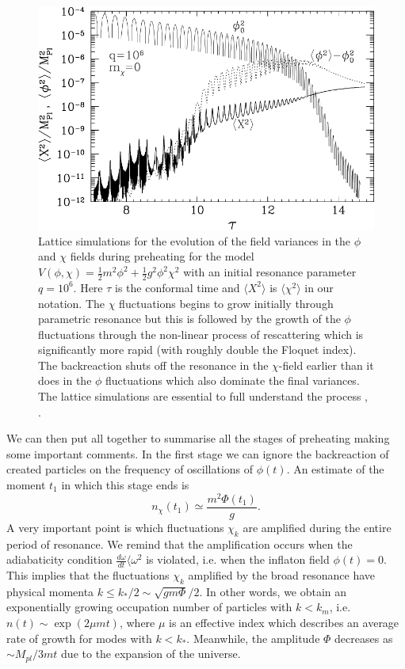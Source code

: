 \documentclass[11pt,a4paper,twoside]{book}
\begin{document}
\begin{figure}
	\centering
	\includegraphics[width=0.6\linewidth, height=0.35\textheight]{Images/Chap4/NonLinearDynamics}
	\caption{Lattice simulations for the evolution of the field  variances in the $\phi$ and $\chi$ fields during preheating for the model $ V(\phi,\chi)=\frac{1}{2}m^{2}\phi^{2} + \frac{1}{2}g^{2}\phi^{2}\chi^{2} $ with an initial resonance parameter $ q=10^{6} $. Here $\tau$  is the conformal time and $ \langle X^{2}\rangle  $ is $ \langle \chi^{2}\rangle   $ in our notation. The $\chi$ fluctuations begins to grow initially through parametric resonance but this is followed by the growth of the $\phi$ fluctuations through the non-linear process of rescattering which is significantly more rapid (with roughly double the Floquet index). The backreaction shuts off the resonance in the $\chi$-field earlier than it does in the $\phi$ fluctuations which also dominate the final variances. The lattice simulations are essential to full understand the process \cite{Chap4:Reference2}, \cite{InflationDynamicsAndReheating:chap1}. }
	\label{fig:nonlineardynamics}
\end{figure}
 We can then put all together to summarise all the stages of preheating making some important comments.
In the first stage we can ignore the backreaction of created particles on the frequency of oscillations of $ \phi(t) $. An estimate of the moment $ t_{1} $ in which this stage ends is 
\begin{equation}
\label{Chap4:estimate}
n_{\chi}(t_{1}) \simeq \frac{m^{2}\Phi(t_{1})}{g}.
\end{equation}
A very important point is which fluctuations $\chi_{k}$ are amplified during the entire period of resonance. We remind that the amplification occurs when the adiabaticity condition $ \frac{d\omega}{dt} \langle  \omega^{2} $ is violated, i.e. when the inflaton field $ \phi(t)=0 $. This implies that the  fluctuations $\chi_{k}$ amplified by the broad resonance have physical momenta $ k \le k_{*}/2 \sim  \sqrt{gm\Phi}/2 $. In other words, we  obtain an exponentially growing occupation number of particles with $ k < k_{m} $, i.e. $ n(t) \sim \exp(2\mu m t) $, where $\mu$ is an effective index which describes an average rate of growth for modes with $ k<k_{*} $. Meanwhile, the amplitude $\Phi$ decreases as $\sim M_{pl}/3mt$ due to the expansion of the universe.
\end{document}
